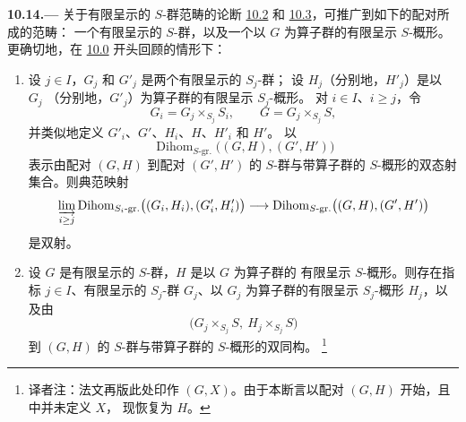 
\medskip
{}\label{par:sga3-VIB-10.14}%
\noindent\textbf{10.14.---}
关于有限呈示的 \(S\)-群范畴的论断
\hyperref[lem:sga3-VIB-10.2]{10.2} 和
\hyperref[lem:sga3-VIB-10.3]{10.3}，可推广到如下的配对所成的范畴：
一个有限呈示的 \(S\)-群，以及一个以 \(G\) 为算子群的有限呈示
\(S\)-概形。更确切地，在 \hyperref[par:sga3-VIB-10.0]{10.0}
开头回顾的情形下：

\begin{enumerate}
\item[\textup{(i)}]\label{concl:sga3-VIB-10.14-i}
  设 \(j\in I\)，\(G_j\) 和 \(G'_j\) 是两个有限呈示的 \(S_j\)-群；
  设 \(H_j\)\textup{（分别地，\(H'_j\)）}是以 \(G_j\)
  \textup{（分别地，\(G'_j\)）}为算子群的有限呈示 \(S_j\)-概形。
  对 \(i\in I\)、\(i\geq j\)，令
  \[
    G_i=G_j\times_{S_j}S_i,
    \qquad
    G=G_j\times_{S_j}S,
  \]
  并类似地定义 \(G'_i\)、\(G'\)、\(H_i\)、\(H\)、\(H'_i\) 和 \(H'\)。
  以
  \[
    \operatorname{Dihom}_{S\text{-}\mathrm{gr.}}
      \bigl((G,H),(G',H')\bigr)
  \]
  表示由配对 \((G,H)\) 到配对 \((G',H')\) 的 \(S\)-群与带算子群的
  \(S\)-概形的双态射集合。则典范映射
  \label{form:sga3-VIB-10.14-Dihom-limit}%
  \[
    \varinjlim_{i\geq j}
      \operatorname{Dihom}_{S_i\text{-}\mathrm{gr.}}
        \bigl((G_i,H_i),(G'_i,H'_i)\bigr)
      \longrightarrow
      \operatorname{Dihom}_{S\text{-}\mathrm{gr.}}
        \bigl((G,H),(G',H')\bigr)
  \]
  是双射。

\item[\textup{(ii)}]\label{concl:sga3-VIB-10.14-ii}
  设 \(G\) 是有限呈示的 \(S\)-群，\(H\) 是以 \(G\) 为算子群的
  有限呈示 \(S\)-概形。则存在指标 \(j\in I\)、有限呈示的
  \(S_j\)-群 \(G_j\)、以 \(G_j\) 为算子群的有限呈示 \(S_j\)-概形
  \(H_j\)，以及由
  \[
    \bigl(G_j\times_{S_j}S,\ H_j\times_{S_j}S\bigr)
  \]
  到 \((G,H)\) 的 \(S\)-群与带算子群的 \(S\)-概形的双同构。%
  \begingroup
  \renewcommand{\thefootnote}{\fnsymbol{footnote}}%
  \footnote[1]{\label{note:sga3-VIB-10.14-GH}
  译者注：法文再版此处印作 \((G,X)\)。由于本断言以配对 \((G,H)\)
  开始，且  中并未定义 \(X\)，
  现恢复为 \(H\)。}%
  \endgroup
\end{enumerate}

